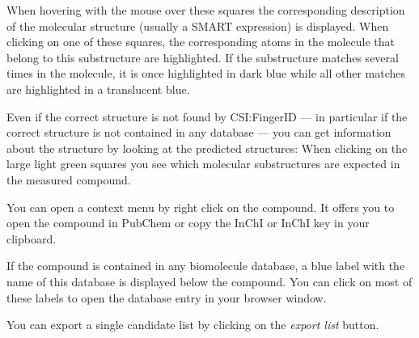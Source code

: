 \documentclass[letterpaper,10pt,openany,oneside]{sphinxmanual}
\newcommand\gui[1]{\textsl{\guilsinglleft#1\guilsinglright\xspace}}
\begin{document}
When hovering with the mouse over these squares the corresponding description of the molecular structure (usually a SMART expression) is displayed. When clicking on one of these squares, the corresponding atoms in the molecule that belong to this substructure are highlighted. If the substructure matches several times in the molecule, it is once highlighted in dark blue while all other matches are highlighted in a translucent blue.

Even if the correct structure is not found by CSI:FingerID --- in particular
if the correct structure is not contained in any database --- you can get
information about the structure by looking at the predicted structures: When
clicking on the large light green squares you see which molecular
substructures are expected in the measured compound.

You can open a context menu by right click on the compound. It offers you to open the compound in PubChem or copy the InChI or InChI key in your clipboard.

If the compound is contained in any biomolecule database, a blue label with the name of this database is displayed below the compound. You can click on most of these labels to open the database entry in your browser window.

You can export a single candidate list by clicking on the \gui{export list} button.



%
%

\end{document}
